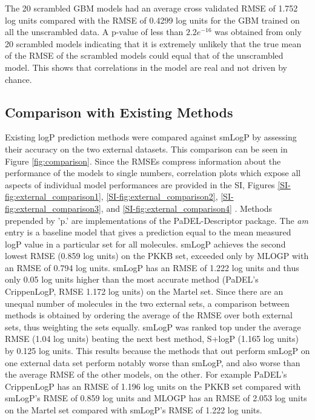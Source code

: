 \documentclass[10pt]{bmc_article}
\newenvironment{bmcformat}{\begin{raggedright}\baselineskip20pt\sloppy\setboolean{publ}{false}}{\end{raggedright}\baselineskip20pt\sloppy}
\begin{document}
\begin{bmcformat}
The 20 scrambled GBM models had an average cross validated RMSE of 1.752 log units compared with the RMSE of 0.4299 log units for the GBM trained on all the unscrambled data. A p-value of less than $2.2e^{-16}$ was obtained from only 20 scrambled models indicating that it is extremely unlikely that the true mean of the RMSE of the scrambled models could equal that of the unscrambled model. This shows that correlations in the model are real and not driven by chance.     

\subsection*{Comparison with Existing Methods}

Existing logP prediction methods were compared against smLogP by assessing their accuracy on the two external datasets. This comparison can be seen in Figure \ref{fig:comparison}. Since the RMSEs compress information about the performance of the models to single numbers, correlation plots which expose all aspects of individual model performances are provided in the SI, Figures \ref{SI-fig:external_comparison1}, \ref{SI-fig:external_comparison2}, \ref{SI-fig:external_comparison3}, and \ref{SI-fig:external_comparison4} . Methods prepended by 'p.' are implementations of the PaDEL-Descriptor package. The \textit{am} entry is a baseline model that gives a prediction equal to the mean measured logP value in a particular set for all molecules. smLogP achieves the second lowest RMSE (0.859 log units) on the PKKB set, exceeded only by MLOGP with an RMSE of 0.794 log units.  smLogP has an RMSE of 1.222 log units and thus only 0.05 log units higher than the most accurate method (PaDEL's CrippenLogP, RMSE 1.172 log units) on the Martel set. Since there are an unequal number of molecules in the two external sets, a comparison between methods is obtained by ordering the average of the RMSE over both external sets, thus weighting the sets equally. smLogP was ranked top under the average RMSE (1.04 log units) beating the next best method, S+logP (1.165 log units) by 0.125 log units. This results because the methods that out perform smLogP on one external data set perform notably worse than smLogP, and also worse than the average RMSE of the other models, on the other. For example PaDEL's CrippenLogP has an RMSE of 1.196 log units on the PKKB set compared with smLogP's RMSE of 0.859 log units and MLOGP has an RMSE of 2.053 log units on the Martel set compared with smLogP's RMSE of 1.222 log units.


\end{bmcformat}
\end{document}
